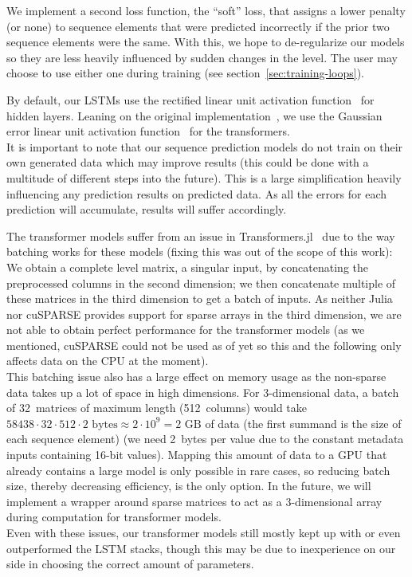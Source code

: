 We implement a second loss function, the ``soft'' loss, that assigns a
lower penalty (or none) to sequence elements that were predicted
incorrectly if the prior two sequence elements were the same. With
this, we hope to de-regularize our models so they are less heavily
influenced by sudden changes in the level. The user may choose to use
either one during training (see section~\ref{sec:training-loops}).

By default, our LSTMs use the rectified linear unit activation
function~\cite{nairRectifiedLinearUnits,RectifierNeuralNetworks2019}
for hidden layers. Leaning on the original
implementation~\cite{OpenaiGpt22019}, we use the Gaussian error linear
unit activation function~\cite{hendrycksGaussianErrorLinear2018} for
the transformers. \\
It is important to note that our sequence prediction models do not
train on their own generated data which may improve results (this
could be done with a multitude of different steps into the future).
This is a large simplification heavily influencing any prediction
results on predicted data. As all the errors for each prediction will
accumulate, results will suffer accordingly.

The transformer models suffer from an issue in
\mbox{Transformers.jl}~\cite{peterChengchingwenTransformersJl2019} due
to the way batching works for these models (fixing this was out of the
scope of this work): We obtain a complete level matrix, a singular
input, by concatenating the preprocessed columns in the second
dimension; we then concatenate multiple of these matrices in the third
dimension to get a batch of inputs. As neither Julia nor cuSPARSE
provides support for sparse arrays in the third dimension, we are not
able to obtain perfect performance for the transformer models (as we
mentioned, cuSPARSE could not be used as of yet so this and the
following only affects data on the CPU at the moment). \\
This batching issue also has a large effect on memory usage as the
non-sparse data takes up a lot of space in high dimensions. For
3-dimensional data, a batch of 32~matrices of maximum length
(512~columns) would take
$58438 \cdot 32 \cdot 512 \cdot 2\text{ bytes} \approx 2 \cdot 10^{9} = 2\text{ GB}$ of data
(the first summand is the size of each sequence element) (we need
2~bytes per value due to the constant metadata inputs containing
16-bit values). Mapping this amount of data to a GPU that already
contains a large model is only possible in rare cases, so reducing
batch size, thereby decreasing efficiency, is the only option. In the
future, we will implement a wrapper around sparse matrices to act as a
3-dimensional array during computation for transformer models. \\
Even with these issues, our transformer models still mostly kept up
with or even outperformed the LSTM stacks, though this may be due to
inexperience on our side in choosing the correct amount of parameters.

